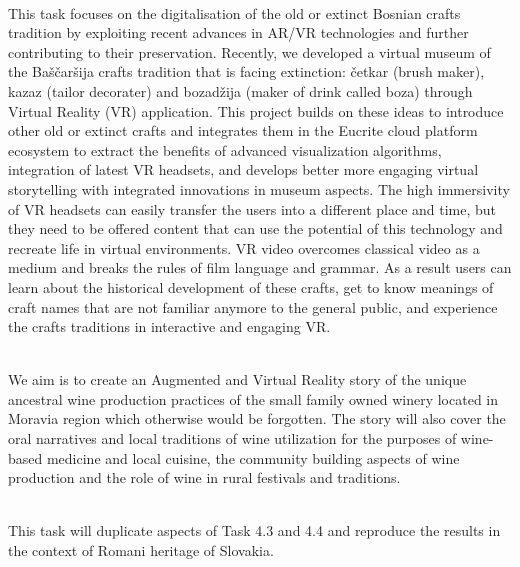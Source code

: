 \\
This task focuses on the digitalisation of the old or extinct Bosnian crafts tradition by exploiting recent advances in AR/VR technologies and further contributing to their preservation. Recently, we developed a virtual museum of the Baščaršija crafts tradition that is facing extinction: četkar (brush maker), kazaz (tailor decorater) and bozadžija (maker of drink called boza) through Virtual Reality (VR) application. This project builds on these ideas to introduce other old or extinct crafts and integrates them in the Eucrite cloud platform ecosystem to extract the benefits of advanced visualization algorithms, integration of latest VR headsets, and develops better more engaging virtual storytelling with integrated innovations in museum aspects. The high immersivity of VR headsets can easily transfer the users into a different place and time, but they need to be offered content that can use the potential of this technology and recreate life in virtual environments. VR video overcomes classical video as a medium and breaks the rules of film language and grammar. As a result users can learn about the historical development of these crafts, get to know meanings of craft names that are not familiar anymore to the general public, and experience the crafts traditions in interactive and engaging VR.

\\
We aim is to create an Augmented and Virtual Reality story of the unique ancestral wine production practices of the small family owned winery located in Moravia region which otherwise would be forgotten. The story will also cover the oral narratives and local traditions of wine utilization for the purposes of wine-based medicine and local cuisine, the community building aspects of wine production and the role of wine in rural festivals and traditions.

\\
This task will duplicate aspects of Task 4.3 and 4.4 and reproduce the results in the context of Romani heritage of Slovakia.


